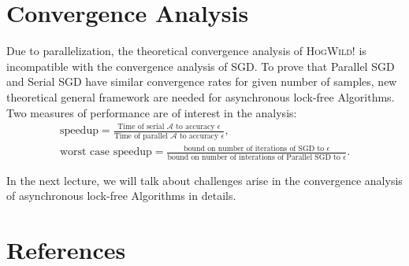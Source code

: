 \documentclass[12pt]{report}
\begin{document}
\section{Convergence Analysis}
Due to parallelization, the theoretical convergence analysis of \textsc{HogWild!} is incompatible with the convergence analysis of SGD. To prove that Parallel SGD and Serial SGD have similar convergence rates for given number of samples, new theoretical general framework are needed for asynchronous lock-free Algorithms.  Two measures of performance are of interest in the analysis:
\begin{gather*}
\text{speedup} = \frac{\text{Time of serial } \mathcal{A} \text{ to accuracy } \epsilon}{\text{Time of parallel } \mathcal{A} \text{ to accuracy } \epsilon},\\
\text{worst case speedup} = \frac{\text{bound on number of iterations of SGD to } \epsilon}{\text{bound on number of interations of Parallel SGD to } \epsilon}.
\end{gather*}

In the next lecture, we will talk about challenges arise in the convergence analysis of asynchronous lock-free Algorithms in details. 

\section*{References}
\begingroup
\renewcommand{\chapter}[2]{}

\endgroup
\end{document}
